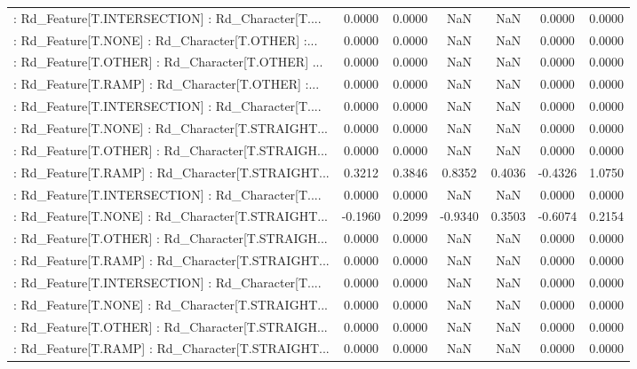\begin{longtable}{p{4cm}cccccc}
 : Rd\_Feature[T.INTERSECTION] : Rd\_Character[T.... &  0.0000 &    0.0000 &     NaN &          NaN &  0.0000 &  0.0000 \\
 : Rd\_Feature[T.NONE] : Rd\_Character[T.OTHER] :... &  0.0000 &    0.0000 &     NaN &          NaN &  0.0000 &  0.0000 \\
 : Rd\_Feature[T.OTHER] : Rd\_Character[T.OTHER] ... &  0.0000 &    0.0000 &     NaN &          NaN &  0.0000 &  0.0000 \\
 : Rd\_Feature[T.RAMP] : Rd\_Character[T.OTHER] :... &  0.0000 &    0.0000 &     NaN &          NaN &  0.0000 &  0.0000 \\
 : Rd\_Feature[T.INTERSECTION] : Rd\_Character[T.... &  0.0000 &    0.0000 &     NaN &          NaN &  0.0000 &  0.0000 \\
 : Rd\_Feature[T.NONE] : Rd\_Character[T.STRAIGHT... &  0.0000 &    0.0000 &     NaN &          NaN &  0.0000 &  0.0000 \\
 : Rd\_Feature[T.OTHER] : Rd\_Character[T.STRAIGH... &  0.0000 &    0.0000 &     NaN &          NaN &  0.0000 &  0.0000 \\
 : Rd\_Feature[T.RAMP] : Rd\_Character[T.STRAIGHT... &  0.3212 &    0.3846 &  0.8352 &       0.4036 & -0.4326 &  1.0750 \\
 : Rd\_Feature[T.INTERSECTION] : Rd\_Character[T.... &  0.0000 &    0.0000 &     NaN &          NaN &  0.0000 &  0.0000 \\
 : Rd\_Feature[T.NONE] : Rd\_Character[T.STRAIGHT... & -0.1960 &    0.2099 & -0.9340 &       0.3503 & -0.6074 &  0.2154 \\
 : Rd\_Feature[T.OTHER] : Rd\_Character[T.STRAIGH... &  0.0000 &    0.0000 &     NaN &          NaN &  0.0000 &  0.0000 \\
 : Rd\_Feature[T.RAMP] : Rd\_Character[T.STRAIGHT... &  0.0000 &    0.0000 &     NaN &          NaN &  0.0000 &  0.0000 \\
 : Rd\_Feature[T.INTERSECTION] : Rd\_Character[T.... &  0.0000 &    0.0000 &     NaN &          NaN &  0.0000 &  0.0000 \\
 : Rd\_Feature[T.NONE] : Rd\_Character[T.STRAIGHT... &  0.0000 &    0.0000 &     NaN &          NaN &  0.0000 &  0.0000 \\
 : Rd\_Feature[T.OTHER] : Rd\_Character[T.STRAIGH... &  0.0000 &    0.0000 &     NaN &          NaN &  0.0000 &  0.0000 \\
 : Rd\_Feature[T.RAMP] : Rd\_Character[T.STRAIGHT... &  0.0000 &    0.0000 &     NaN &          NaN &  0.0000 &  0.0000 \\

\end{longtable}
